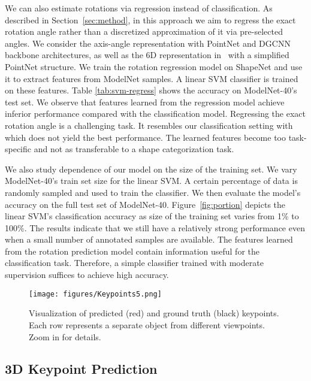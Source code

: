 \documentclass[10pt,twocolumn,letterpaper]{article}
\begin{document}
We can also estimate rotations via regression instead of classification. As described in Section~\ref{sec:method}, in this approach we aim to regress the exact rotation angle rather than a discretized approximation of it via  pre-selected angles. 
We consider the axis-angle representation with PointNet and DGCNN backbone architectures, as well as the 6D representation in~\cite{zhou2019continuity} with a simplified PointNet structure. 
We train the rotation regression model on ShapeNet and use it to extract features from ModelNet samples. A linear SVM classifier is trained on these features.    
Table \ref{tab:svm-regress} shows the accuracy on ModelNet-40's test set. We observe that features learned from the regression model achieve inferior performance compared with the classification model. Regressing the exact rotation angle is a challenging task. It resembles our classification setting with  which does not yield the best performance. The learned features become too task-specific and not as transferable to a shape categorization task. 

We also study dependence of our model on the size of the training set. 
We vary ModelNet-40's train set size for the linear SVM. A certain percentage of data is randomly sampled and used to train the classifier. 
We then evaluate the model's accuracy on the full test set of ModelNet-40. Figure~\ref{fig:portion} depicts the linear SVM's classification accuracy as size of the training set varies from 1\% to 100\%. The results indicate that we still have a relatively strong performance even when a small number of annotated samples are available. The features learned from the rotation prediction model contain information useful for the classification task. Therefore, a simple classifier trained with moderate supervision suffices to achieve high accuracy. 



\begin{figure*}
\centering
\texttt{[image: figures/Keypoints5.png]}
\vspace{0.01cm}
\caption{Visualization of predicted (red) and ground truth (black) keypoints. Each row represents a separate object from different viewpoints. Zoom in for details. }
\label{fig:keypoints}
\end{figure*}

\subsection{3D Keypoint Prediction}
\end{document}
